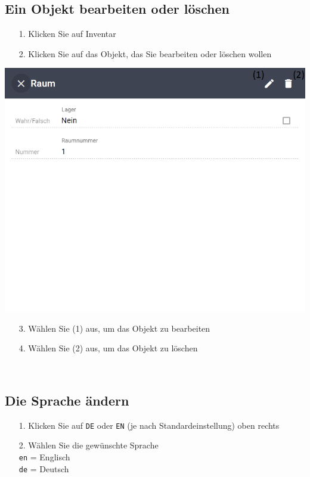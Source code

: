 \documentclass[11pt,a4paper]{report}
\begin{document}
	\subsection{Ein Objekt bearbeiten oder löschen}

	\begin{itemize}
		\item[1.] Klicken Sie auf \glqq{}Inventar\grqq{}
		\item[2.] Klicken Sie auf das Objekt, das Sie bearbeiten oder löschen wollen
	\end{itemize}

	\begin{minipage}{0.5\linewidth}
	\includegraphics[width=\linewidth]{ObjektInventaredit.png}
	\end{minipage}
	\hfill
	\begin{minipage}{0.4\linewidth}
	\begin{itemize}
		\item[3.] Wählen Sie (1) aus, um das Objekt zu bearbeiten
		\item[4.] Wählen Sie (2) aus, um das Objekt zu löschen
	\end{itemize}
	\end{minipage}\\

	\subsection{Die Sprache ändern}
	\begin{itemize}
		\item[1.] Klicken Sie auf \texttt{DE} oder \texttt{EN} (je nach Standardeinstellung) oben rechts
		\item[2.] Wählen Sie die gewünschte Sprache\\
		\texttt{en} = Englisch\\
		\texttt{de} = Deutsch
	\end{itemize}
\end{document}
